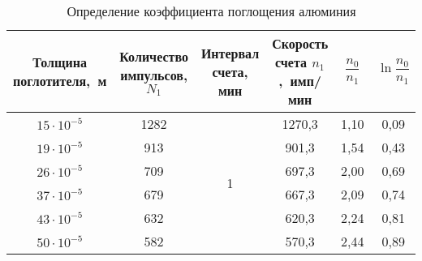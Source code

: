 \documentclass[10pt, pscyr, nonums]{hedlabwork}
\begin{document}
  \pagebreak
  
  \begin{table}[h!]
    \center
    \caption{Определение коэффициента поглощения алюминия}
    \begin{tabular}{|*{6}{C{.13}|}} \hline
      Толщина поглотителя,~м &
        Количество импульсов, \( N_1 \) &
        Интервал счета, мин &
        Скорость счета \( n_1 \),~имп/мин &
        \( \dfrac{n_0}{n_1} \) &
        \( \ln\dfrac{n_0}{n_1} \) \\ \hline
      \( 15 \cdot 10^{-5} \) & 1282 &  &
        1270,3 & 1,10 & 0,09 \\ 
      \( 19 \cdot 10^{-5} \) & 913 &&
        901,3  & 1,54 & 0,43 \\ 
      \( 26 \cdot 10^{-5} \) & 709 &&
        697,3  & 2,00 & 0,69 \\ 
      \( 37 \cdot 10^{-5} \) & 679 &&
        667,3  & 2,09 & 0,74 \\ 
      \( 43 \cdot 10^{-5} \) & 632 &&
        620,3  & 2,24 & 0,81 \\ 
      \( 50 \cdot 10^{-5} \) & 582 &&
        570,3  & 2,44 & 0,89 \\ \hline
    \end{tabular}
  \end{table}
\end{document}
